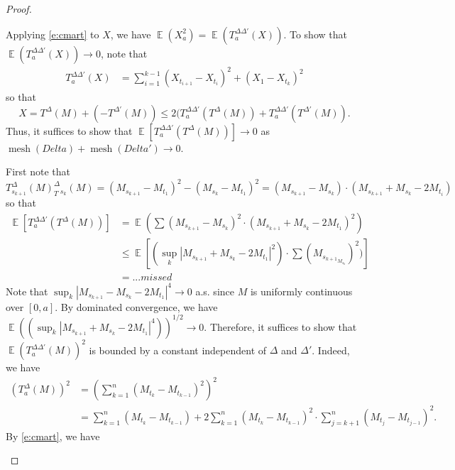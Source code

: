 \documentclass[11pt, a4paper]{memoir}
\theoremstyle{change}
\theoremstyle{plain}
\theoremstyle{nonumberplain}
\newtheorem{proof}{Proof}
\DeclareMathOperator{\E}{{\mathbb{E}}}
\DeclareMathOperator{\mesh}{mesh}
\numberwithin{equation}{section}
\begin{document}
\begin{proof}
\begin{enumerate}[nl]
            Applying \cref{e:cmart} to $X$, we have $\E(X_a^2)=\E(T_a^{\Delta\Delta'}(X))$.
            To show that $\E(T_a^{\Delta\Delta'}(X))\to 0$, note that
            \begin{align*}
                T_a^{\Delta\Delta'}(X) &= \sum_{i=1}^{k-1}(X_{t_{i+1}}-X_{t_i})^2+(X_1-X_{t_k})^2
            \end{align*}
            so that
            \begin{equation*}
                X=T^\Delta(M)+(-T^{\Delta'}(M))\leq 2(T_a^{\Delta\Delta'}(T^\Delta(M))+T_a^{\Delta\Delta'}(T^{\Delta'}(M)).
            \end{equation*}
            Thus, it suffices to show that $\E[T_a^{\Delta\Delta'}(T^\Delta(M))]\to 0$ as $\mesh(Delta)+\mesh(Delta')\to 0$.

            First note that
            \begin{equation*}
                T^\Delta_{s_{k+1}}(M)_T^\Delta_{s_k}(M) = (M_{s_{k+1}}-M_{t_1})^2-(M_{s_k}-M_{t_1})^2=(M_{s_{k+1}}-M_{s_k})\cdot(M_{s_{k+1}}+M_{s_k}-2M_{t_i})
            \end{equation*}
            so that
            \begin{align*}
                \E[T_a^{\Delta\Delta'}(T^\Delta(M))] &= \E(\sum(M_{s_{k+1}}-M_{s_k})^2\cdot(M_{s_{k+1}}+M_{s_k}-2M_{t_1})^2)\\
                                                     &\leq\E[(\sup_k|M_{s_{k+1}}+M_{s_k}-2M_{t_1}|^2)\cdot\sum(M_{s_{k+1}}_M_{s_k})^2)]\\
                                                     &= ...missed
            \end{align*}
            Note that $\sup_k|M_{s_{k+1}}-M_{s_k}-2M_{t_1}|^4\to 0$ a.s. since $M$ is uniformly continuous over $[0,a]$.
            By dominated convergence, we have $\E((\sup_k|M_{s_{k+1}}+M_{s_k}-2M_{t_1}|^4))^{1/2}\to 0$.
            Therefore, it suffices to show that $\E(T_a^{\Delta\Delta'}(M))^2$ is bounded by a constant independent of $\Delta$ and $\Delta'$.
            Indeed, we have
            \begin{align*}
                (T_a^\Delta(M))^2 &= \left(\sum_{k=1}^n(M_{t_k}-M_{t_{k-1}})^2\right)^2\\
                                  &= \sum_{k=1}^n (M_{t_k}-M_{t_{k-1}})+2\sum_{k=1}^n(M_{t_k}-M_{t_{k-1}})^2\cdot\sum_{j=k+1}^n(M_{t_j}-M_{t_{j-1}})^2.
            \end{align*}
            By \cref{e:cmart}, we have
            \begin{equation*}

\end{equation*}
\end{enumerate}
\end{proof}
\end{document}
